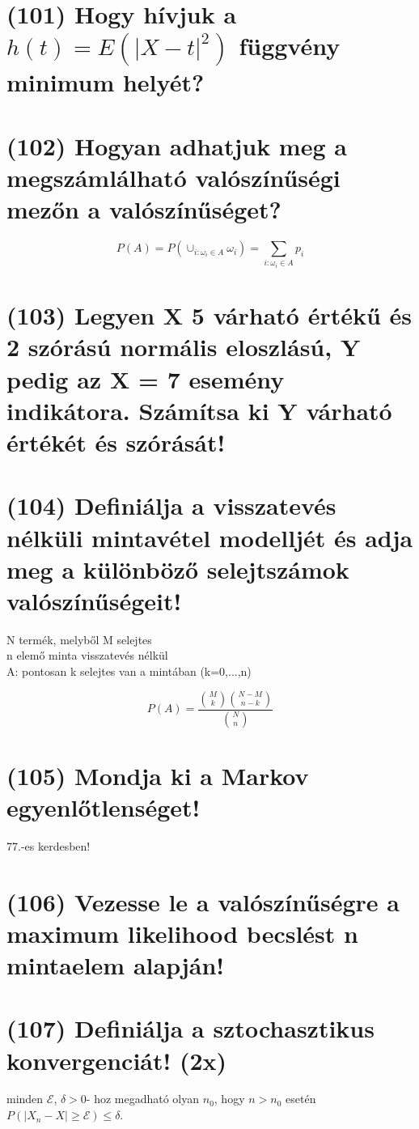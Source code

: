 \documentclass[12p]{article}
\begin{document}
\section{(101) Hogy hívjuk a $h(t) = E(|X - t|^2)$ függvény minimum helyét?}

\section{(102) Hogyan adhatjuk meg a megszámlálható valószínűségi mezőn a valószínűséget?}

$$P(A) = P(\cup_{i:\omega_i \in A} \omega_i) = \sum_{i:\omega_i \in A} p_i$$

\section{(103) Legyen X 5 várható értékű és 2 szórású normális eloszlású, Y pedig az X = 7 esemény indikátora. Számítsa ki Y várható értékét és szórását!}

\section{(104)  Definiálja a visszatevés nélküli mintavétel modelljét és adja meg a különböző selejtszámok valószínűségeit!}

N termék, melyből M selejtes\\
n elemő minta visszatevés nélkül\\
A: pontosan k selejtes van a mintában
(k=0,...,n)

$$P(A) = \frac{{M \choose k}{{N - M} \choose {n - k}}}{{N \choose n}}$$

\section{(105) Mondja ki a Markov egyenlőtlenséget!}

77.-es kerdesben!

\section{(106) Vezesse le a valószínűségre a maximum likelihood becslést n mintaelem alapján!}

\section{(107) Definiálja a sztochasztikus konvergenciát! (2x)}

 minden $\mathcal{E}$, $\delta>0$-
hoz megadható olyan $n_0$, hogy $n>n_0$ esetén $P(|X_n-X| \geq \mathcal{E}) \leq \delta$.
\end{document}
